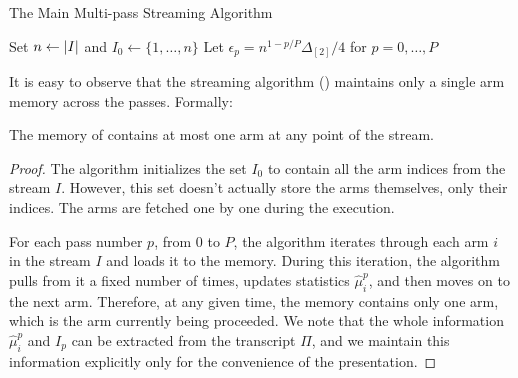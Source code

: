 
\begin{algorithm}
    \caption{The Main Multi-pass Streaming Algorithm}\label{alg:main}
    Set \(n \gets \left| I \right|\) and \(I_0 \gets \{1, \dotsc, n\}\)\;
    Let \(\epsilon_p = n^{1-p/P}\Delta_{[2]} / 4\) for \(p = 0, \dotsc, P\) \;
\end{algorithm}


It is easy to observe that the streaming algorithm () maintains only a single arm memory across the passes. Formally:
\begin{lemma}\label{lem:main-alg-memory}
The memory of  contains at most one arm at any point of the stream.
\end{lemma}
\begin{proof}
The algorithm initializes the set \(I_0\) to contain all the arm indices from the stream \(I\). However, this set doesn't actually store the arms themselves, only their indices. The arms are fetched one by one during the execution. 

For each pass number \(p\), from \(0\) to \(P\), the algorithm iterates through each arm \(i\) in the stream \(I\) and loads it to the memory. During this iteration, the algorithm pulls from it a fixed number of times, updates statistics \(\hat\mu^{p}_i\), and then moves on to the next arm. Therefore, at any given time, the memory contains only one arm, which is the arm currently being proceeded. 
We note that the whole information \(\hat\mu^p_i\) and \(I_p\) can be extracted from the transcript \(\Pi\), and we maintain this information explicitly only for the convenience of the presentation.  
\end{proof}


